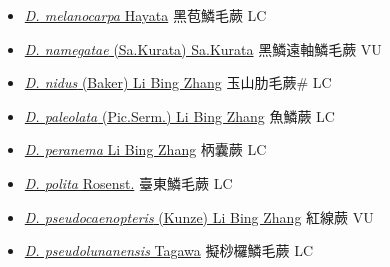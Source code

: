\begin{itemize}
\begin{itemize}
        \item[] \href{http://www.theplantlist.org/tpl1.1/search?q=Dryopteris+melanocarpa}{\textit{D. melanocarpa} Hayata}   黑苞鱗毛蕨 LC
        \item[] \href{http://www.theplantlist.org/tpl1.1/search?q=Dryopteris+namegatae}{\textit{D. namegatae} (Sa.Kurata) Sa.Kurata}   黑鱗遠軸鱗毛蕨 VU
        \item[] \href{http://www.theplantlist.org/tpl1.1/search?q=Dryopteris+nidus}{\textit{D. nidus} (Baker) Li Bing Zhang}     玉山肋毛蕨\# LC
        \item[] \href{http://www.theplantlist.org/tpl1.1/search?q=Dryopteris+paleolata}{\textit{D. paleolata} (Pic.Serm.) Li Bing Zhang}     魚鱗蕨 LC
        \item[] \href{http://www.theplantlist.org/tpl1.1/search?q=Dryopteris+peranema}{\textit{D. peranema} Li Bing Zhang}   柄囊蕨 LC
        \item[] \href{http://www.theplantlist.org/tpl1.1/search?q=Dryopteris+polita}{\textit{D. polita} Rosenst.}   臺東鱗毛蕨 LC
        \item[] \href{http://www.theplantlist.org/tpl1.1/search?q=Dryopteris+pseudocaenopteris}{\textit{D. pseudocaenopteris} (Kunze) Li Bing Zhang}     紅線蕨 VU
        \item[] \href{http://www.theplantlist.org/tpl1.1/search?q=Dryopteris+pseudolunanensis}{\textit{D. pseudolunanensis} Tagawa}   擬桫欏鱗毛蕨 LC

\end{itemize}
\end{itemize}

